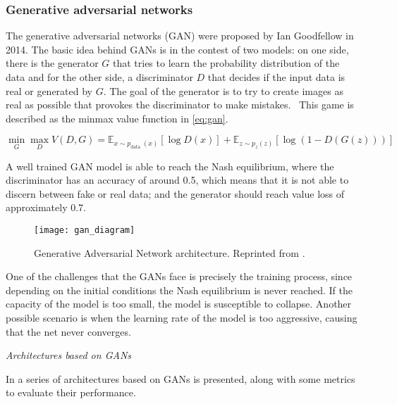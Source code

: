 \subsubsection{Generative adversarial networks}

The generative adversarial networks (GAN) were proposed by Ian Goodfellow \cite{Goodfellow2014} in 2014. The basic idea behind GANs is in the contest of two models: on one side, there is the generator $G$ that tries to learn the probability distribution of the data and for the other side, a discriminator $D$ that decides if the input data is real or generated by $G$. The goal of the generator is to try to create images as real as possible that provokes the discriminator to make mistakes.  This game is described as the minmax value function in \ref{eq:gan}.

\begin{equation}
 \min _{G} \max _{D} V(D, G)=\mathbb{E}_{x \sim p_{\text {data }}(x)}[\log D(x)]+\mathbb{E}_{z \sim p_{z}(z)}[\log (1-D(G(z)))]
 \label{eq:gan}
\end{equation}

A well trained GAN model is able to reach the Nash equilibrium, where the discriminator has an accuracy of around 0.5, which means that it is not able to discern between fake or real data; and the generator should reach value loss of approximately 0.7.

\begin{figure}[htb]
  \centering
  \texttt{[image: gan\_diagram]}
  \caption[Generative Adversarial Network architecture]{Generative Adversarial Network architecture. Reprinted from \cite{overview_of_gan_structure}.}
  \label{fig:gan}
\end{figure}

One of the challenges that the GANs face is precisely the training process, since depending on the initial conditions the Nash equilibrium is never reached. If the capacity of the model is too small, the model is susceptible to collapse. Another possible scenario is when the learning rate of the model is too aggressive, causing that the net never converges.

\textit{Architectures based on GANs}

In \cite{Pan2019} a series of architectures based on GANs is presented, along with some metrics to evaluate their performance.

